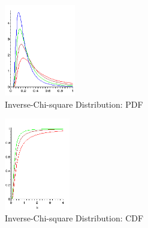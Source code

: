 \begin{table}[H]
    \begin{minipage}{0.49\linewidth}
        \begin{figure}[H]
            \centering
            \includegraphics[width=\linewidth, height=4cm, keepaspectratio]{Pictures/distributions/Inverse_chi_squared_pdf.png}
            \caption{Inverse-Chi-square Distribution: PDF}
        \end{figure}
    \end{minipage}
    \hfill
    \begin{minipage}{0.49\linewidth}
        \begin{figure}[H]
            \centering
            \includegraphics[width=\linewidth, height=4cm, keepaspectratio]{Pictures/distributions/Inverse_chi_squared_cdf.png}
            \caption{Inverse-Chi-square Distribution: CDF}
        \end{figure}
    \end{minipage}
\end{table}

